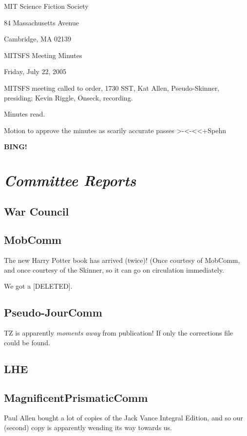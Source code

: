 \documentclass[10pt]{article}
\newcommand{\bing}{{\bf BING!} }
\newcommand{\goto}[1]{\bing \vskip 12pt \section*{{\em{#1}}}}
\begin{document}
\begin{center}

MIT Science Fiction Society

84 Massachusetts Avenue

Cambridge, MA 02139

\vspace{12pt}

MITSFS Meeting Minutes

Friday, July 22, 2005

\end{center}

\vspace{18pt}

\setlength{\parskip}{6pt}

\noindent
MITSFS meeting called to order, 1730 SST, Kat Allen, 
Pseudo-Skinner, presiding; Kevin Riggle,  Onseck, recording.

Minutes read.

Motion to approve the minutes as scarily accurate passes >-<-<<+Spehn

\goto{Committee Reports}
\subsection*{War Council}

\subsection*{MobComm}
The new Harry Potter book has arrived (twice)!  (Once courtesy of MobComm, and once courtesy of the Skinner,
so it can go on circulation immediately.

We got a [DELETED].

\subsection*{Pseudo-JourComm}
TZ is apparently \emph{moments away} from publication!  If only the corrections file could be found.

\subsection*{LHE}

\subsection*{MagnificentPrismaticComm}
Paul Allen bought a lot of copies of the Jack Vance Integral Edition, and so our (second) copy is apparently
wending its way towards us.
\end{document}
